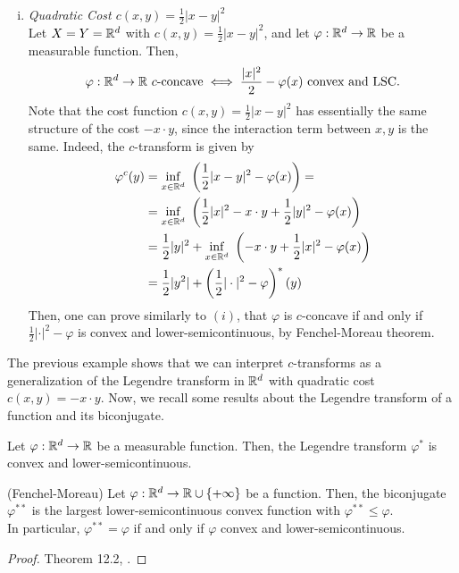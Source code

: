 \documentclass[../main.tex]{subfiles}
\begin{document}
\begin{example}
\begin{enumerate}[(i)]
$$        $$
        and 
        $$
        \varphi(x) \leq \inf_{y\in X} \ (d(x, y) + \varphi(y)) = \inf_{y\in X} \ (d(x, y) - \psi(y)) = \psi^c(x) \quad \text{by Lipschitz}.
        $$
        In particular, the computation also shows that the $c$-transform of $\varphi$ is $\varphi^c = -\varphi$.
        \item \textit{Quadratic Cost $c(x, y) = \frac{1}{2}|x-y|^2$} \\
        Let $X = Y = \mathbb{R}^d$ with $c(x, y) = \frac{1}{2}|x-y|^2$, and let $\varphi: \mathbb{R}^d \to \mathbb{R}$ be a measurable function. Then,
        $$
        \varphi: \mathbb{R}^d \to \mathbb{R} \ c\text{-concave} \iff \frac{|x|^2}{2}-\varphi(x) \ \text{convex and LSC}.
        $$
        Note that the cost function $c(x, y) = \frac{1}{2} |x-y|^2$ has essentially the same structure of the cost $-x\cdot y$, since the interaction term between $x, y$ is the same. Indeed, the $c$-transform is given by
        \begin{align*}
            \varphi^c(y) 
            &= \inf_{x\in\mathbb{R}^d} \ \left(\frac{1}{2}|x-y|^2 - \varphi(x)\right) = \\
            &= \inf_{x\in\mathbb{R}^d} \ \left(\frac{1}{2}|x|^2 - x\cdot y + \frac{1}{2}|y|^2 - \varphi(x)\right) \\
            &= \frac{1}{2}|y|^2 + \inf_{x\in\mathbb{R}^d} \ \left(-x\cdot y + \frac{1}{2}|x|^2 - \varphi(x)\right) \\
            &= \frac{1}{2}|y^2| + \left(\frac{1}{2}|\cdot|^2 - \varphi\right)^*(y)
        \end{align*} 
        Then, one can prove similarly to $(i)$, that $\varphi$ is $c$-concave if and only if $\frac{1}{2}|\cdot|^2 - \varphi$ is convex and lower-semicontinuous, by Fenchel-Moreau theorem.
    \end{enumerate}
\end{example}

The previous example shows that we can interpret $c$-transforms as a generalization of the Legendre transform in $\mathbb{R}^d$ with quadratic cost $c(x, y) = -x\cdot y$. Now, we recall some results about the Legendre transform of a function and its biconjugate.

\begin{proposition}
    Let $\varphi: \mathbb{R}^d \to \mathbb{R}$ be a measurable function. Then, the Legendre transform $\varphi^*$ is convex and lower-semicontinuous.
\end{proposition}

\begin{theorem}
    (Fenchel-Moreau)
    Let $\varphi: \mathbb{R}^d \to \mathbb{R}\cup\{+\infty\}$ be a function. Then, the biconjugate $\varphi^{**}$ is the largest lower-semicontinuous convex function with $\varphi^{**} \leq \varphi$. \\ In particular, $\varphi^{**}=\varphi$ if and only if $\varphi$ convex and lower-semicontinuous.
\end{theorem}
\begin{proof}
    Theorem 12.2, \cite{rockafellar1997convex}.
\end{proof}
\end{document}

